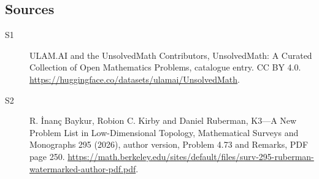 \documentclass[11pt]{article}
\begin{document}
\subsection{Sources}
\begin{description}
\item[\hypertarget{source:statement:1}{S1}] ULAM.AI and the UnsolvedMath Contributors, UnsolvedMath: A Curated Collection of Open Mathematics Problems, catalogue entry. CC BY 4.0. \url{https://huggingface.co/datasets/ulamai/UnsolvedMath}.
\item[\hypertarget{source:statement:2}{S2}] R. İnanç Baykur, Robion C. Kirby and Daniel Ruberman, K3—A New Problem List in Low-Dimensional Topology, Mathematical Surveys and Monographs 295 (2026), author version, Problem 4.73 and Remarks, PDF page 250. \url{https://math.berkeley.edu/sites/default/files/surv-295-ruberman-watermarked-author-pdf.pdf}.
\end{description}
\label{end:statement}
\end{document}
